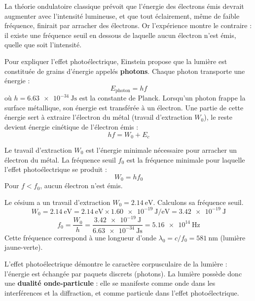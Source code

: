 \begin{remarque}
La théorie ondulatoire classique prévoit que l'énergie des électrons émis devrait augmenter avec l'intensité lumineuse, et que tout éclairement, même de faible fréquence, finirait par arracher des électrons. Or l'expérience montre le contraire : il existe une fréquence seuil en dessous de laquelle aucun électron n'est émis, quelle que soit l'intensité.
\end{remarque}

\begin{loi}[Einstein — 1905]
Pour expliquer l'effet photoélectrique, Einstein propose que la lumière est constituée de grains d'énergie appelés \textbf{photons}. Chaque photon transporte une énergie :
\[
E_{\text{photon}} = h f
\]
où \(h = \SI{6.63e-34}{\joule\second}\) est la constante de Planck.
Lorsqu'un photon frappe la surface métallique, son énergie est transférée à un électron. Une partie de cette énergie sert à extraire l'électron du métal (travail d'extraction \(W_0\)), le reste devient énergie cinétique de l'électron émis :
\[
h f = W_0 + E_c
\]
\end{loi}

\begin{definition}
Le travail d'extraction \(W_0\) est l'énergie minimale nécessaire pour arracher un électron du métal. La fréquence seuil \(f_0\) est la fréquence minimale pour laquelle l'effet photoélectrique se produit :
\[
W_0 = h f_0
\]
Pour \(f < f_0\), aucun électron n'est émis.
\end{definition}

\begin{exemple}
Le césium a un travail d'extraction \(W_0 = \SI{2.14}{\electronvolt}\). Calculons sa fréquence seuil.
\[
W_0 = \SI{2.14}{\electronvolt} = \SI{2.14}{\electronvolt} \times \SI{1.60e-19}{\joule\per\electronvolt} = \SI{3.42e-19}{\joule}
\]
\[
f_0 = \frac{W_0}{h} = \frac{\SI{3.42e-19}{\joule}}{\SI{6.63e-34}{\joule\second}} = \SI{5.16e14}{\hertz}
\]
Cette fréquence correspond à une longueur d'onde \(\lambda_0 = c/f_0 = \SI{581}{\nano\metre}\) (lumière jaune-verte).
\end{exemple}

\begin{aretenir}
L'effet photoélectrique démontre le caractère corpusculaire de la lumière : l'énergie est échangée par paquets discrets (photons). La lumière possède donc une \textbf{dualité onde-particule} : elle se manifeste comme onde dans les interférences et la diffraction, et comme particule dans l'effet photoélectrique.
\end{aretenir}

